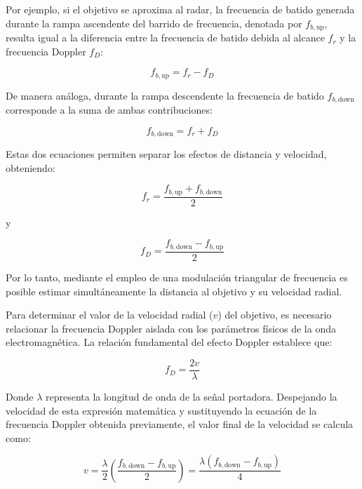 Por ejemplo, si el objetivo se aproxima al radar, la frecuencia de batido generada durante la rampa ascendente del barrido de frecuencia, denotada por $f_{b,\text{up}}$, resulta igual a la diferencia entre la frecuencia de batido debida al alcance $f_r$ y la frecuencia Doppler $f_D$:

\begin{equation}
    f_{b,\text{up}} = f_r - f_D
\end{equation}

De manera análoga, durante la rampa descendente la frecuencia de batido $f_{b,\text{down}}$ corresponde a la suma de ambas contribuciones:

\begin{equation}
    f_{b,\text{down}} = f_r + f_D
\end{equation}

Estas dos ecuaciones permiten separar los efectos de distancia y velocidad, obteniendo:

\begin{equation}
    f_r = \frac{f_{b,\text{up}} + f_{b,\text{down}}}{2}
\end{equation}

y

\begin{equation}
    f_D = \frac{f_{b,\text{down}} - f_{b,\text{up}}}{2}
\end{equation}

Por lo tanto, mediante el empleo de una modulación triangular de frecuencia es posible estimar simultáneamente la distancia al objetivo y su velocidad radial.

Para determinar el valor de la velocidad radial ($v$) del objetivo, es necesario relacionar la frecuencia Doppler aislada con los parámetros físicos de la onda electromagnética. La relación fundamental del efecto Doppler establece que:

\begin{equation}
    f_D = \frac{2v}{\lambda}
\end{equation}

Donde $\lambda$ representa la longitud de onda de la señal portadora. Despejando la velocidad de esta expresión matemática y sustituyendo la ecuación de la frecuencia Doppler obtenida previamente, el valor final de la velocidad se calcula como:

\begin{equation}
    v = \frac{\lambda}{2} \left( \frac{f_{b,\text{down}} - f_{b,\text{up}}}{2} \right) = \frac{\lambda (f_{b,\text{down}} - f_{b,\text{up}})}{4}
\end{equation}

